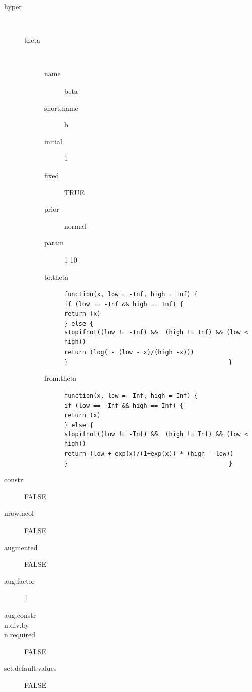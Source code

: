 \begin{description}
	\item[hyper]\ 
	 \begin{description}
	 	\item[theta]\ 
	 	 \begin{description}
	 	 	 \item[ name ] beta 
	 	 	 \item[ short.name ] b 
	 	 	 \item[ initial ] 1 
	 	 	 \item[ fixed ] TRUE 
	 	 	 \item[ prior ] normal 
	 	 	 \item[ param ] 1 10 
	 	 	 \item[ to.theta ] \verb|function(x, low = -Inf, high = Inf) {| \verb|                                                if (low == -Inf && high == Inf) {| \verb|                                                    return (x)| \verb|                                                } else {| \verb|                                                    stopifnot((low != -Inf) &&  (high != Inf) && (low < high))| \verb|                                                    return (log( - (low - x)/(high -x))) | \verb|                                                }| \verb|                                            }| 
	 	 	 \item[ from.theta ] \verb|function(x, low = -Inf, high = Inf) {| \verb|                                                if (low == -Inf && high == Inf) {| \verb|                                                    return (x)| \verb|                                                } else {| \verb|                                                    stopifnot((low != -Inf) &&  (high != Inf) && (low < high))| \verb|                                                    return (low + exp(x)/(1+exp(x)) * (high - low))| \verb|                                                }| \verb|                                            }| 
	 	 \end{description}
	 \end{description}
	 \item[ constr ] FALSE 
	 \item[ nrow.ncol ] FALSE 
	 \item[ augmented ] FALSE 
	 \item[ aug.factor ] 1 
	 \item[ aug.constr ]  
	 \item[ n.div.by ]  
	 \item[ n.required ] FALSE 
	 \item[ set.default.values ] FALSE 
\end{description}
